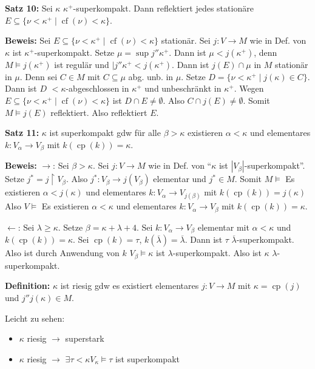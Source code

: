 \documentclass[a4paper,fontsize=11pt]{scrartcl}
\newcommand{\cf}{\operatorname{cf}}
\newcommand{\cp}{\operatorname{cp}}
\renewcommand{\bar}[1]{\overline{#1}}
\begin{document}
{\bf Satz 10:} Sei $\kappa$ $\kappa^+$-superkompakt.
	Dann reflektiert jedes stationäre $E\subseteq\{\nu<\kappa^+\mid \cf(\nu)<\kappa\}$.
	
	{\bf Beweis:} Sei $E\subseteq\{\nu<\kappa^+\mid \cf(\nu)<\kappa\}$ stationär.
		Sei  $j\colon V\to M$ wie in Def. von $\kappa$ ist $\kappa^+$-superkompakt.
		Setze $\mu=\sup j''\kappa^+$.
		Dann ist $\mu<j(\kappa^+)$, denn $M\models j(\kappa^+)$ ist regulär und $|j''\kappa^+<j(\kappa^+)$.
		Dann ist $j(E)\cap\mu$ in $M$ stationär in $\mu$.
		Denn sei $C\in M$ mit $C\subseteq\mu$ abg. unb. in $\mu$.
		Setze $D=\{\nu<\kappa^+\mid j(\kappa)\in C\}$.
		Dann ist $D$ $<\kappa$-abgeschlossen in $\kappa^+$ und unbeschränkt in $\kappa^+$.
		Wegen $E\subseteq\{\nu<\kappa^+\mid \cf(\nu)<\kappa\}$ ist $D\cap E\neq\emptyset$.
		Also $C\cap j(E)\neq\emptyset$.
		Somit $M\models j(E)$ reflektiert. Also reflektiert $E$.
		

{\bf Satz 11:} $\kappa$ ist superkompakt gdw für alle $\beta>\kappa$ existieren $\alpha<\kappa$ und elementares $k\colon V_\alpha\to V_\beta$ mit $k(\cp(k))=\kappa$.

	{\bf Beweis:} $\to$: Sei $\beta>\kappa$. Sei $j\colon V\to M$ wie in Def. von ``$\kappa$ ist $|V_\beta|$-superkompakt''.
		Setze $j^*=j\upharpoonright V_\beta$.
		Also $j^*\colon V_\beta\to j(V_\beta)$ elementar und $j^*\in M$.
		Somit $M\models$ Es existieren $\alpha<j(\kappa)$ und elementares $k\colon V_\alpha\to V_{j(\beta)}$ mit $k(\cp(k))=j(\kappa)$\newline
		 Also $V\models$ Es existieren $\alpha<\kappa$ und elementares $k\colon V_\alpha\to V_\beta$ mit $k(\cp(k))=\kappa$.

		$\leftarrow$: Sei $\lambda\ge\kappa$. Setze $\beta=\kappa+\lambda+4$.
		Sei $k\colon V_\alpha\to V_\beta$ elementar mit $\alpha<\kappa$ und $k(\cp(k))=\kappa$.
		Sei $\cp(k)=\tau$, $k(\bar\lambda)=\bar\lambda$.
		Dann ist $\tau$ $\bar\lambda$-superkompakt.
		Also ist durch Anwendung von $k$ $V_\beta\models \kappa$ ist $\lambda$-superkompakt.
		Also ist $\kappa$ $\lambda$-superkompakt.


{\bf Definition:} $\kappa$ ist riesig gdw es existiert elementares $j\colon V\to M$ mit $\kappa=\cp(j)$ und $j''j(\kappa)\in M$.

	Leicht zu sehen: \begin{itemize} \item $\kappa$ riesig $\to$ superstark
		\item $\kappa$ riesig $\to$ $\exists \tau<\kappa V_{\kappa}\models \tau $ ist  superkompakt
	\end{itemize}
\end{document}

